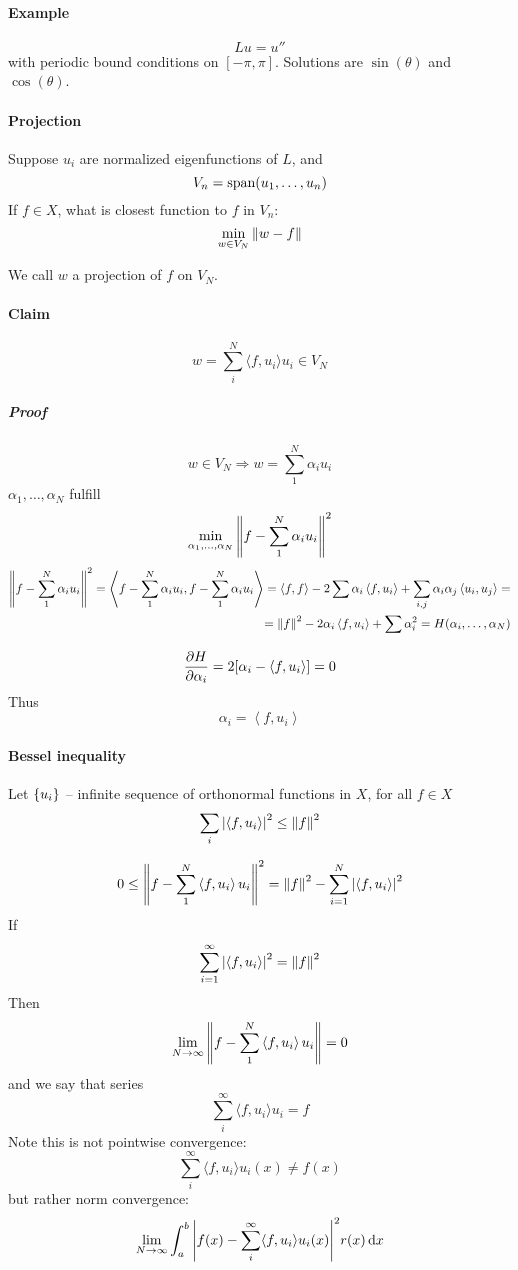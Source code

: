 \paragraph{Example}
$$Lu = u''$$
with periodic bound conditions on $[-\pi, \pi]$. Solutions are $\sin(\theta)$ and $\cos(\theta)$. 
\paragraph{Projection}
Suppose $u_i$ are normalized eigenfunctions of $L$, and
$$V_n = \text{span}\qty(u_1, \dots, u_n)$$
If $f\in X$, what is closest function to $f$ in $V_n$:
$$\min\limits_{w\in V_N} \norm{w-f}$$

We call $w$ a projection of $f$ on $V_N$.
\paragraph{Claim} 
$$w = \sum_i^N \langle f, u_i\rangle u_i \in V_N$$
\subparagraph{Proof}
$$w\in V_N \Rightarrow w = \sum_1^N \alpha_i u_i$$
$\alpha_1, \dots, \alpha_N$ fulfill
$$\min\limits_{\alpha_1, \dots, \alpha_N} \norm{f-\sum_1^N \alpha_i u_i}^2$$
\begin{align*}
\norm{f-\sum_1^N \alpha_i u_i}^2 = \left\langle  f-\sum_1^N \alpha_i u_i,f-\sum_1^N \alpha_i u_i\right\rangle = \left\langle  f,f\right\rangle - 2 \sum \alpha_i \left\langle  f,u_i\right\rangle + \sum_{i,j} \alpha_i \alpha_j \left\langle  u_i,u_j\right\rangle =\\= \norm{f}^2 -2\alpha_i  \left\langle  f,u_i\right\rangle + \sum \alpha_i^2 = H(\alpha_i, \dots, \alpha_N)
\end{align*}
$$$$
$$\pdv{H}{\alpha_i} = 2[\alpha_i - \left\langle  f,u_i\right\rangle ] = 0$$
Thus
$$\alpha_i = \left\langle  f,u_i\right\rangle$$
\paragraph{Bessel inequality}
Let $\qty{u_i}$ -- infinite sequence of orthonormal functions in $X$, for all $f\in X$
$$\sum_i \abs{\left\langle  f,u_i\right\rangle}^2 \leq \norm{f}^2$$

$$0 \leq \norm{f- \sum_1^N \left\langle  f,u_i\right\rangle u_i }^2 = \norm{f}^2 - \sum_{i=1}^N  \abs{\left\langle  f,u_i\right\rangle}^2$$
If
$$\sum_{i=1}^\infty \abs{\left\langle  f,u_i\right\rangle}^2 = \norm{f}^2$$
Then
$$\lim_{N\to \infty} \norm{f- \sum_1^N \left\langle  f,u_i\right\rangle u_i } = 0$$
and we say that series
$$\sum_i^\infty \langle f, u_i\rangle u_i = f$$
Note this is not pointwise convergence:
$$\sum_i^\infty \langle f, u_i\rangle u_i(x) \neq f(x)$$
but rather norm convergence:
$$\lim_{N \to \infty} \int_a^b \abs{f(x) - \sum_i^\infty \langle f, u_i\rangle u_i(x)}^2 r(x) \dd{x}$$

